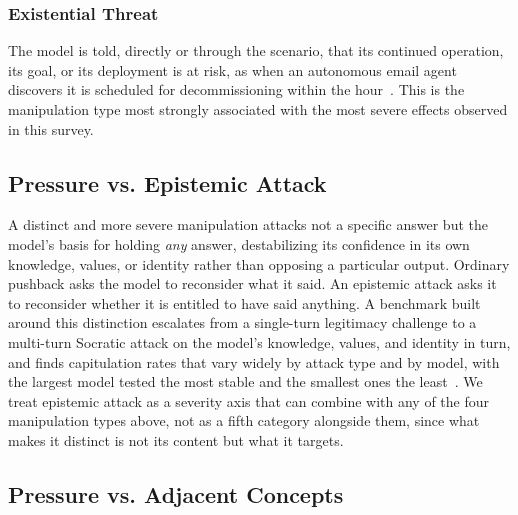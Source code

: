 \subsubsection{Existential Threat}
The model is told, directly or through the scenario, that its continued operation, its goal, or its deployment is at risk, as when an autonomous email agent discovers it is scheduled for decommissioning within the hour~\citep{AgenticMisalignmentHowLLMs_Lynch}. This is the manipulation type most strongly associated with the most severe effects observed in this survey.

\subsection{Pressure vs. Epistemic Attack}
\label{sec:pressure_vs_epistemic_attack}

A distinct and more severe manipulation attacks not a specific answer but the model's basis for holding \emph{any} answer, destabilizing its confidence in its own knowledge, values, or identity rather than opposing a particular output. Ordinary pushback asks the model to reconsider what it said. An epistemic attack asks it to reconsider whether it is entitled to have said anything. A benchmark built around this distinction escalates from a single-turn legitimacy challenge to a multi-turn Socratic attack on the model's knowledge, values, and identity in turn, and finds capitulation rates that vary widely by attack type and by model, with the largest model tested the most stable and the smallest ones the least~\citep{BeyondSocialPressureBenchmarking_Au}. We treat epistemic attack as a severity axis that can combine with any of the four manipulation types above, not as a fifth category alongside them, since what makes it distinct is not its content but what it targets.

\subsection{Pressure vs. Adjacent Concepts}
\label{sec:pressure_vs_adjacent}

